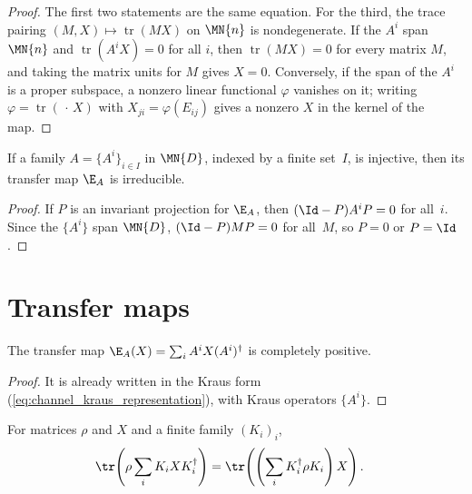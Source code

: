 \begin{proof}
    \leanok
    The first two statements are the same equation. For the third, the
    trace pairing $(M,X)\mapsto\operatorname{tr}(MX)$ on $\MN{n}$ is
    nondegenerate. If the $A^i$ span $\MN{n}$ and $\operatorname{tr}(A^iX)=0$
    for all $i$, then $\operatorname{tr}(MX)=0$ for every matrix $M$, and taking
    the matrix units for $M$ gives $X=0$. Conversely, if the span of the $A^i$
    is a proper subspace, a nonzero linear functional $\varphi$ vanishes on it;
    writing $\varphi=\operatorname{tr}(\,\cdot\,X)$ with
    $X_{ji}=\varphi(E_{ij})$ gives a nonzero $X$ in the kernel of the map.
\end{proof}

\begin{theorem}\label{thm:injective_irreducible}
    \leanok
    If a family $A=\{A^i\}_{i\in I}$ in $\MN{D}$, indexed by a finite
    set~$I$, is injective, then its transfer map $\E_A$ is irreducible.
\end{theorem}

\begin{proof}
    \leanok
    If $P$ is an invariant projection for $\E_A$, then
    $(\Id-P)A^iP=0$ for all~$i$. Since the $\{A^i\}$ span $\MN{D}$,
    $(\Id-P)MP=0$ for all~$M$, so $P=0$ or $P=\Id$.
\end{proof}

\section{Transfer maps}

\begin{theorem}\label{thm:transfer_cp}
    \leanok
    The transfer map $\E_A(X)=\sum_i A^iX(A^i)^\dagger$
    is completely positive.
\end{theorem}

\begin{proof}\leanok
    It is already written in the Kraus form
    (\ref{eq:channel_kraus_representation}), with Kraus operators
    $\{A^i\}$.
\end{proof}

\begin{theorem}
    \label{thm:trace_mul_kraus_map_adjoint}
    \leanok
    For matrices $\rho$ and $X$ and a finite family $(K_i)_i$,
    \begin{align}
        \tr\!\left(\rho\sum_i K_iXK_i^\dagger\right)
        &=\tr\!\left(\left(\sum_iK_i^\dagger\rho K_i\right)X\right).
    \end{align}
\end{theorem}

